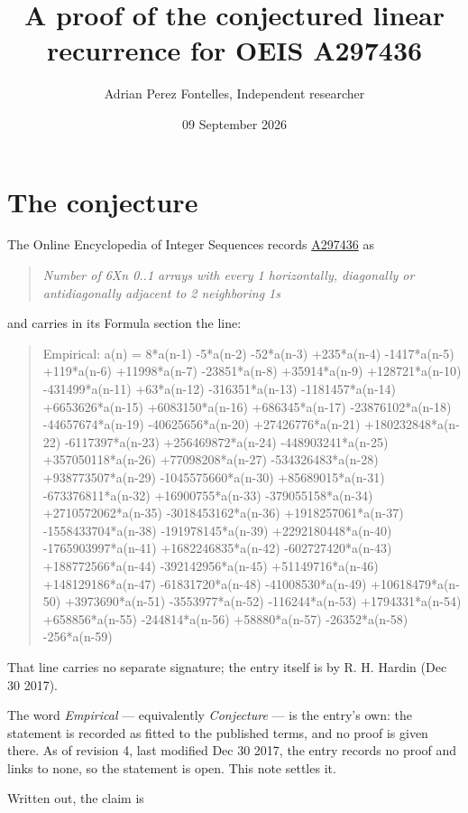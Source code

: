 \documentclass[11pt]{article}
\title{A proof of the conjectured linear recurrence for OEIS A297436}
\author{Adrian Perez Fontelles, Independent researcher}
\date{09 September 2026}
\theoremstyle{definition}
\begin{document}
\maketitle
\section{The conjecture}

The Online Encyclopedia of Integer Sequences records \href{https://oeis.org/A297436}{A297436} as

\begin{quote}\itshape Number of 6Xn 0..1 arrays with every 1 horizontally, diagonally or antidiagonally adjacent to 2 neighboring 1s\end{quote}

and carries in its Formula section the line:

\begin{quote}\ttfamily Empirical: a(n) = 8*a(n-1) -5*a(n-2) -52*a(n-3) +235*a(n-4) -1417*a(n-5) +119*a(n-6) +11998*a(n-7) -23851*a(n-8) +35914*a(n-9) +128721*a(n-10) -431499*a(n-11) +63*a(n-12) -316351*a(n-13) -1181457*a(n-14) +6653626*a(n-15) +6083150*a(n-16) +686345*a(n-17) -23876102*a(n-18) -44657674*a(n-19) -40625656*a(n-20) +27426776*a(n-21) +180232848*a(n-22) -6117397*a(n-23) +256469872*a(n-24) -448903241*a(n-25) +357050118*a(n-26) +77098208*a(n-27) -534326483*a(n-28) +938773507*a(n-29) -1045575660*a(n-30) +85689015*a(n-31) -673376811*a(n-32) +16900755*a(n-33) -379055158*a(n-34) +2710572062*a(n-35) -3018453162*a(n-36) +1918257061*a(n-37) -1558433704*a(n-38) -191978145*a(n-39) +2292180448*a(n-40) -1765903997*a(n-41) +1682246835*a(n-42) -602727420*a(n-43) +188772566*a(n-44) -392142956*a(n-45) +51149716*a(n-46) +148129186*a(n-47) -61831720*a(n-48) -41008530*a(n-49) +10618479*a(n-50) +3973690*a(n-51) -3553977*a(n-52) -116244*a(n-53) +1794331*a(n-54) +658856*a(n-55) -244814*a(n-56) +58880*a(n-57) -26352*a(n-58) -256*a(n-59)\end{quote}

That line carries no separate signature; the entry itself is by R. H. Hardin (Dec 30 2017).

The word {\itshape Empirical} --- equivalently {\itshape Conjecture} --- is the entry's own: the statement is recorded as fitted to the published terms, and no proof is given there. As of revision 4, last modified Dec 30 2017, the entry records no proof and links to none, so the statement is open. This note settles it.

Written out, the claim is
\end{document}
